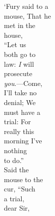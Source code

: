 \documentclass[12pt,openany]{memoir}
\renewenvironment{quote}%
  {\list{}{\leftmargin=2\parindent\rightmargin=0in}\item[]}%
  {\endlist}
\begin{document}
\begin{quote}
\fontsize{12pt}{14pt}\selectfont
\hspace*{4.0cm}      `Fury said to a\\
\fontsize{11pt}{13pt}\selectfont
\hspace*{4.0cm}      mouse, That he\\
\hspace*{3.6cm}     met in the\\
\hspace*{3.2cm}    house,\\
\hspace*{2.4cm}  ``Let us\\
\hspace*{2.8cm}   both go to\\
\hspace*{3.2cm}    law: \textit{I} will\\
\hspace*{3.6cm}     prosecute\\
\hspace*{4.0cm}      \textit{\itshape you}.---Come,\\
\hspace*{4.8cm}        I'll take no\\
\hspace*{4.8cm}        denial; We\\
\hspace*{4.4cm}       must have a\\
\hspace*{3.6cm}     trial: For\\
\hspace*{2.8cm}   really this\\
\fontsize{10pt}{12pt}\selectfont
\hspace*{2.4cm}  morning I've\\
\hspace*{2.0cm} nothing\\
\hspace*{2.0cm} to do.''\\
\hspace*{2.8cm}   Said the\\
\hspace*{2.8cm}   mouse to the\\
\hspace*{3.2cm}    cur, ``Such\\
\hspace*{3.6cm}     a trial,\\
\hspace*{4.0cm}      dear Sir,\\

\end{quote}
\end{document}
